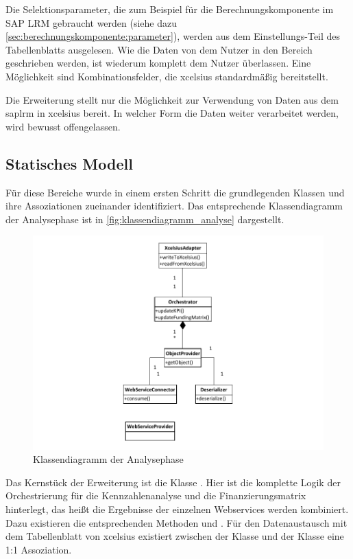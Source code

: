 \begin{onehalfspacing}
Die Selektionsparameter, die zum Beispiel für die Berechnungskomponente im SAP LRM gebraucht werden (siehe dazu \vref{sec:berechnungskomponente:parameter}), werden aus dem Ein\-stel\-lungs-Teil des Tabellenblatts ausgelesen. Wie die Daten von dem Nutzer in den Bereich geschrieben werden, ist wiederum komplett dem Nutzer überlassen. Eine Möglichkeit sind Kombinationsfelder, die \gls{xcelsius} standardmäßig bereitstellt.

Die Erweiterung stellt nur die Möglichkeit zur Verwendung von Daten aus dem \gls{saplrm} in \gls{xcelsius} bereit. In welcher Form die Daten weiter verarbeitet werden, wird bewusst offengelassen.

\subsection{Statisches Modell}
Für diese Bereiche wurde in einem ersten Schritt die grundlegenden Klassen und ihre Assoziationen zueinander identifiziert. Das entsprechende Klassendiagramm der Analysephase ist in \vref{fig:klassendiagramm_analyse} dargestellt.

\begin{figure}[ht]
\centering
\setlength{\unitlength}{1mm}
\includegraphics[width=15cm]{Visio/Analyse.pdf}
\caption{Klassendiagramm der Analysephase \label{fig:klassendiagramm_analyse}}
\end{figure}

Das Kernstück der Erweiterung ist die Klasse . Hier ist die komplette Logik der Orchestrierung für die Kennzahlenanalyse und die Finanzierungsmatrix hinterlegt, das heißt die Ergebnisse der einzelnen Webservices werden kombiniert. Dazu existieren die entsprechenden Methoden  und . Für den Datenaustausch mit dem Tabellenblatt von \gls{xcelsius} existiert zwischen der Klasse  und der Klasse  eine 1:1 Assoziation.


\end{onehalfspacing}
